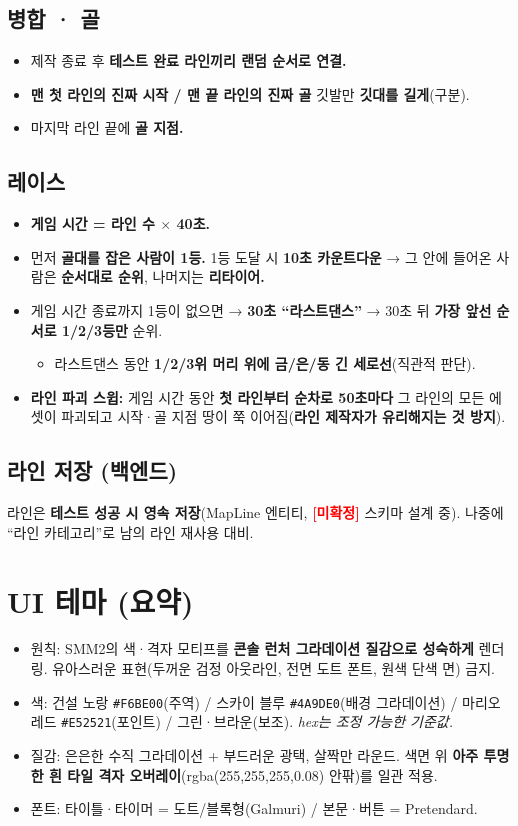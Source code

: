 \documentclass[11pt]{article}
\newcommand{\tbd}{\textcolor{red}{\textbf{[미확정]}}}
\begin{document}
\subsection{병합 · 골}
\begin{itemize}
  \item 제작 종료 후 \textbf{테스트 완료 라인끼리 랜덤 순서로 연결.}
  \item \textbf{맨 첫 라인의 진짜 시작 / 맨 끝 라인의 진짜 골} 깃발만 \textbf{깃대를 길게}(구분).
  \item 마지막 라인 끝에 \textbf{골 지점.}
\end{itemize}

\subsection{레이스}
\begin{itemize}
  \item \textbf{게임 시간 = 라인 수 $\times$ 40초.}
  \item 먼저 \textbf{골대를 잡은 사람이 1등.} 1등 도달 시 \textbf{10초 카운트다운} → 그 안에 들어온 사람은 \textbf{순서대로 순위}, 나머지는 \textbf{리타이어.}
  \item 게임 시간 종료까지 1등이 없으면 → \textbf{30초 ``라스트댄스''} → 30초 뒤 \textbf{가장 앞선 순서로 1/2/3등만} 순위.
  \begin{itemize}
    \item 라스트댄스 동안 \textbf{1/2/3위 머리 위에 금/은/동 긴 세로선}(직관적 판단).
  \end{itemize}
  \item \textbf{라인 파괴 스윕:} 게임 시간 동안 \textbf{첫 라인부터 순차로 50초마다} 그 라인의 모든 에셋이 파괴되고 시작·골 지점 땅이 쭉 이어짐(\textbf{라인 제작자가 유리해지는 것 방지}).
\end{itemize}

\subsection{라인 저장 (백엔드)}
라인은 \textbf{테스트 성공 시 영속 저장}(MapLine 엔티티, \tbd{} 스키마 설계 중). 나중에 ``라인 카테고리''로 남의 라인 재사용 대비.

\section{UI 테마 (요약)}
\begin{itemize}
  \item 원칙: SMM2의 색·격자 모티프를 \textbf{콘솔 런처 그라데이션 질감으로 성숙하게} 렌더링. 유아스러운 표현(두꺼운 검정 아웃라인, 전면 도트 폰트, 원색 단색 면) 금지.
  \item 색: 건설 노랑 \texttt{\#F6BE00}(주역) / 스카이 블루 \texttt{\#4A9DE0}(배경 그라데이션) / 마리오 레드 \texttt{\#E52521}(포인트) / 그린·브라운(보조). \emph{hex는 조정 가능한 기준값.}
  \item 질감: 은은한 수직 그라데이션 + 부드러운 광택, 살짝만 라운드. 색면 위 \textbf{아주 투명한 흰 타일 격자 오버레이}(rgba(255,255,255,0.08) 안팎)를 일관 적용.
  \item 폰트: 타이틀·타이머 = 도트/블록형(Galmuri) / 본문·버튼 = Pretendard.
\end{itemize}
\end{document}
